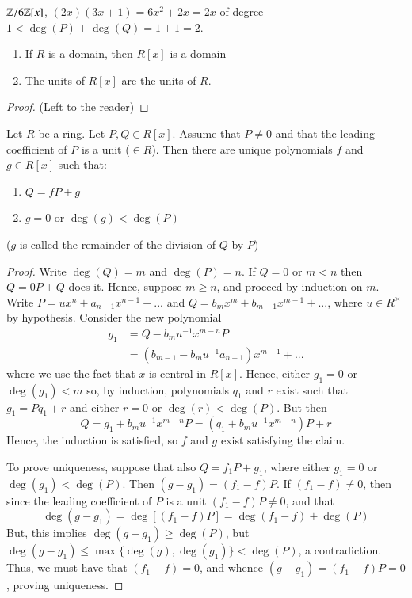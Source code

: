 \documentclass[12pt, a4paper, oneside, openright, titlepage]{book}
\begin{document}
\begin{eg}
    $\mathbb Z/6\mathbb Z[x]$, $(2x)(3x+1) = 6x^2+2x = 2x$ of degree $1 < \deg(P) + \deg(Q) = 1 + 1 = 2$.
\end{eg}

\begin{cor}
    \leavevmode
    \begin{enumerate}
        \item If $R$ is a domain, then $R[x]$ is a domain
        \item The units of $R[x]$ are the units of $R$.
    \end{enumerate}
    \begin{proof}
        (Left to the reader)
    \end{proof}
\end{cor}

\begin{thm}
    Let $R$ be a ring. Let $P,Q \in R[x]$. Assume that $P \neq 0$ and that the leading coefficient of $P$ is a unit ($\in R$). Then there are unique polynomials $f$ and $g \in R[x]$ such that: \begin{enumerate}
        \item $Q = fP + g$
        \item $g = 0$ or $\deg(g) < \deg(P)$
    \end{enumerate}
    ($g$ is called the remainder of the division of $Q$ by $P$)
\end{thm}
\begin{proof}
    Write $\deg(Q) = m$ and $\deg(P) = n$. If $Q = 0$ or $m < n$ then $Q = 0P + Q$ does it. Hence, suppose $m \geq n$, and proceed by induction on $m$. Write $P = ux^n + a_{n-1}x^{n-1} + ...$ and $Q = b_mx^m + b_{m-1}x^{m-1} + ...$, where $u \in R^{\times}$ by hypothesis. Consider the new polynomial \begin{align*}
        g_1 &= Q - b_mu^{-1}x^{m-n}P \\
        &= (b_{m-1} - b_mu^{-1}a_{n-1})x^{m-1} + ...
    \end{align*}
    where we use the fact that $x$ is central in $R[x]$. Hence, either $g_1 = 0$ or $\deg(g_1) < m$ so, by induction, polynomials $q_1$ and $r$ exist such that $g_1 = Pq_1 + r$ and either $r = 0$ or $\deg(r) < \deg(P)$. But then $$Q = g_1 + b_mu^{-1}x^{m-n}P = (q_1 + b_mu^{-1}x^{m-n})P + r$$
    Hence, the induction is satisfied, so $f$ and $g$ exist satisfying the claim. 
    
    To prove uniqueness, suppose that also $Q = f_1P + g_1$, where either $g_1 = 0$ or $\deg(g_1) < \deg(P)$. Then $(g-g_1) = (f_1-f)P$. If $(f_1-f) \neq 0$, then since the leading coefficient of $P$ is a unit $(f_1-f)P \neq 0$, and that $$\deg(g-g_1) = \deg[(f_1-f)P] = \deg(f_1-f)+\deg(P)$$ But, this implies $\deg(g-g_1) \geq \deg(P)$, but $\deg(g-g_1) \leq \max\{\deg(g),\deg(g_1)\} < \deg(P)$, a contradiction. Thus, we must have that $(f_1-f) = 0$, and whence $(g-g_1) = (f_1 - f)P = 0$, proving uniqueness.
\end{proof}
\end{document}
